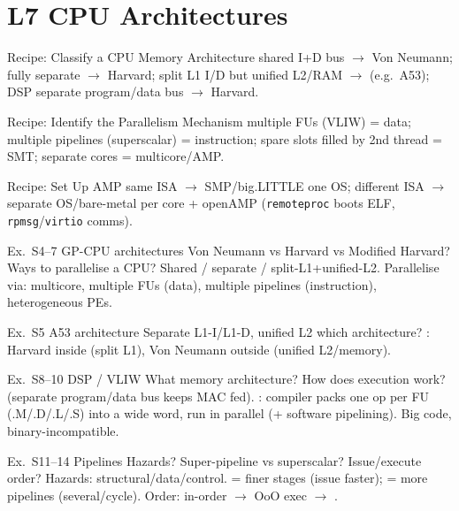 \section{L7 CPU Architectures}

\begin{KR}{Recipe: Classify a CPU Memory Architecture}
    shared I+D bus $\to$ Von Neumann; fully separate $\to$ Harvard; split L1 I/D but unified L2/RAM $\to$  (e.g.\ A53); DSP separate program/data bus $\to$ Harvard.
\end{KR}

\begin{KR}{Recipe: Identify the Parallelism Mechanism}
    multiple FUs (VLIW) = data; multiple pipelines (superscalar) = instruction; spare slots filled by 2nd thread = SMT; separate cores = multicore/AMP.
\end{KR}

\begin{KR}{Recipe: Set Up AMP}
    same ISA $\to$ SMP/big.LITTLE one OS; different ISA $\to$ separate OS/bare-metal per core + openAMP (\texttt{remoteproc} boots ELF, \texttt{rpmsg}/\texttt{virtio} comms).
\end{KR}

\begin{example2}{Ex.\ S4--7 GP-CPU architectures}
    Von Neumann vs Harvard vs Modified Harvard? Ways to parallelise a CPU?
    \tcblower
    Shared / separate / split-L1+unified-L2. Parallelise via: multicore, multiple FUs (data), multiple pipelines (instruction), heterogeneous PEs.
\end{example2}

\begin{example2}{Ex.\ S5 A53 architecture}
    Separate L1-I/L1-D, unified L2 which architecture?
    \tcblower
    : Harvard inside (split L1), Von Neumann outside (unified L2/memory).
\end{example2}

\begin{example2}{Ex.\ S8--10 DSP / VLIW}
    What memory architecture? How does execution work?
    \tcblower
     (separate program/data bus keeps MAC fed). : compiler packs one op per FU (.M/.D/.L/.S) into a wide word, run in parallel (+ software pipelining). Big code, binary-incompatible.
\end{example2}

\begin{example2}{Ex.\ S11--14 Pipelines}
    Hazards? Super-pipeline vs superscalar? Issue/execute order?
    \tcblower
    Hazards: structural/data/control.  = finer stages (issue faster);  = more pipelines (several/cycle). Order: in-order $\to$ OoO exec $\to$ .
\end{example2}

